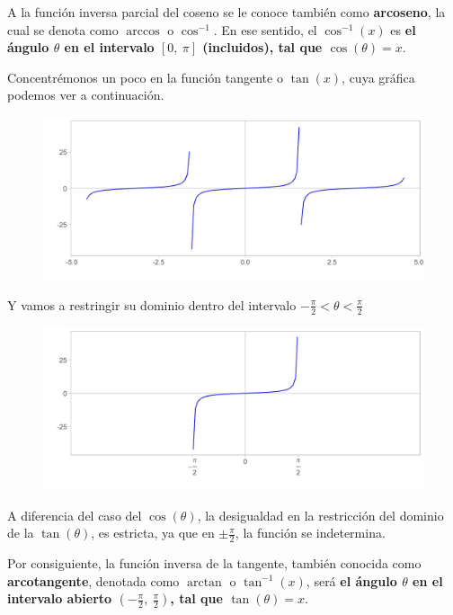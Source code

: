 \documentclass[12pt]{article}
\begin{document}
A la función inversa parcial del coseno se le conoce también como \textbf{arcoseno}, la cual se denota como $\arccos$ o $\cos^{-1}$. En ese sentido, el $\cos^{-1}(x)$ es \textbf{el ángulo $\theta$ en el intervalo $[0, \ \pi]$ (incluidos), tal que $\cos(\theta) = x$}.

Concentrémonos un poco en la función tangente o $\tan(x)$, cuya gráfica podemos ver a continuación.

\begin{figure}[hbt!]
\centering
\includegraphics[scale=0.7]{img/tang_fun.jpg}
\end{figure}

Y vamos a restringir su dominio dentro del intervalo $-\frac{\pi}{2} < \theta < \frac{\pi}{2}$

\newpage

\begin{figure}[hbt!]
\centering
\includegraphics[scale=0.7]{img/tang_fun_restr.jpg}
\end{figure}

A diferencia del caso del $\cos(\theta)$, la desigualdad en la restricción del dominio de la $\tan(\theta)$, es estricta, ya que en $\pm\frac{\pi}{2}$, la función se indetermina.

Por consiguiente, la función inversa de la tangente, también conocida como \textbf{arcotangente}, denotada como $\arctan$ o $\tan^{-1}(x)$, será \textbf{el ángulo $\theta$ en el intervalo abierto $\left(-\frac{\pi}{2}, \ \frac{\pi}{2}\right)$, tal que $\tan(\theta) = x$}.
\end{document}

